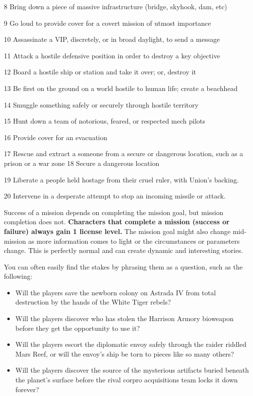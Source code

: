  8         Bring down a piece of massive infrastructure (bridge, skyhook, dam, etc)

 9         Go loud to provide cover for a covert mission of utmost importance

  10       Assassinate a VIP, discretely, or in broad daylight, to send a message

  11       Attack a hostile defensive position in order to destroy a key objective

  12       Board a hostile ship or station and take it over; or, destroy it

  13       Be first on the ground on a world hostile to human life; create a beachhead

  14       Smuggle something safely or securely through hostile territory

  15       Hunt down a team of notorious, feared, or respected mech pilots

  16       Provide cover for an evacuation

  17       Rescue and extract a someone from a secure or dangerous location, such as a prison
           or a war zone
  18       Secure a dangerous location

  19       Liberate a people held hostage from their cruel ruler, with Union’s backing.

  20       Intervene in a desperate attempt to stop an incoming missile or attack.

Success of a mission depends on completing the mission goal, but mission completion does
not. \textbf{Characters that complete a mission (success or failure) always gain 1 license level.} The
mission goal might also change mid-mission as more information comes to light or the
circumstances or parameters change. This is perfectly normal and can create dynamic and
interesting stories.

You can often easily find the stakes by phrasing them as a question, such as the following:
\begin{itemize}
\item Will the players save the newborn colony on Astrada IV from total destruction by the hands of the White Tiger rebels?
\item Will the players discover who has stolen the Harrison Armory bioweapon before they get the opportunity to use it?
\item Will the players escort the diplomatic envoy safely through the raider riddled Mars Reef, or will the envoy’s ship be torn to pieces like so many others?
\item Will the players discover the source of the mysterious artifacts buried beneath the planet’s surface before the rival corpro acquisitions team locks it down forever?
\end{itemize}  

